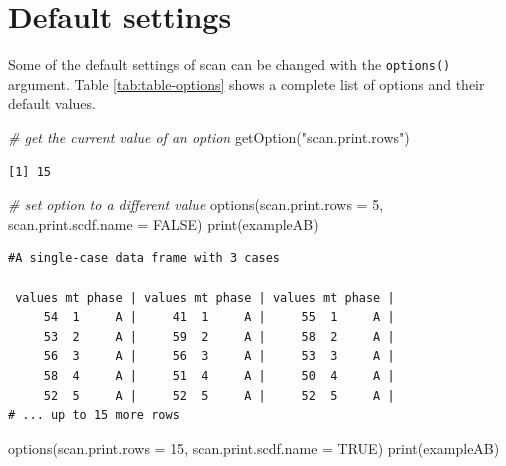\documentclass[
]{book}
\newenvironment{Shaded}{\begin{snugshade}}{\end{snugshade}}
\newcommand{\AttributeTok}[1]{\textcolor[rgb]{0.77,0.63,0.00}{#1}}
\newcommand{\CommentTok}[1]{\textcolor[rgb]{0.56,0.35,0.01}{\textit{#1}}}
\newcommand{\ConstantTok}[1]{\textcolor[rgb]{0.00,0.00,0.00}{#1}}
\newcommand{\DecValTok}[1]{\textcolor[rgb]{0.00,0.00,0.81}{#1}}
\newcommand{\FunctionTok}[1]{\textcolor[rgb]{0.00,0.00,0.00}{#1}}
\newcommand{\NormalTok}[1]{#1}
\newcommand{\StringTok}[1]{\textcolor[rgb]{0.31,0.60,0.02}{#1}}
\begin{document}
\hypertarget{default-settings}{%
\chapter{Default settings}\label{default-settings}}

Some of the default settings of scan can be changed with the \texttt{options()} argument. Table \ref{tab:table-options} shows a complete list of options and their default values.

\begin{Shaded}
\begin{Highlighting}[]
\CommentTok{\# get the current value of an option}
\FunctionTok{getOption}\NormalTok{(}\StringTok{"scan.print.rows"}\NormalTok{)}
\end{Highlighting}
\end{Shaded}

\begin{verbatim}
[1] 15
\end{verbatim}

\begin{Shaded}
\begin{Highlighting}[]
\CommentTok{\# set option to a different value}
\FunctionTok{options}\NormalTok{(}\AttributeTok{scan.print.rows =} \DecValTok{5}\NormalTok{, }\AttributeTok{scan.print.scdf.name =} \ConstantTok{FALSE}\NormalTok{)}
\FunctionTok{print}\NormalTok{(exampleAB)}
\end{Highlighting}
\end{Shaded}

\begin{verbatim}
#A single-case data frame with 3 cases

 values mt phase | values mt phase | values mt phase |
     54  1     A |     41  1     A |     55  1     A |
     53  2     A |     59  2     A |     58  2     A |
     56  3     A |     56  3     A |     53  3     A |
     58  4     A |     51  4     A |     50  4     A |
     52  5     A |     52  5     A |     52  5     A |
# ... up to 15 more rows
\end{verbatim}

\begin{Shaded}
\begin{Highlighting}[]
\FunctionTok{options}\NormalTok{(}\AttributeTok{scan.print.rows =} \DecValTok{15}\NormalTok{, }\AttributeTok{scan.print.scdf.name =} \ConstantTok{TRUE}\NormalTok{)}
\FunctionTok{print}\NormalTok{(exampleAB)}
\end{Highlighting}
\end{Shaded}
\end{document}
